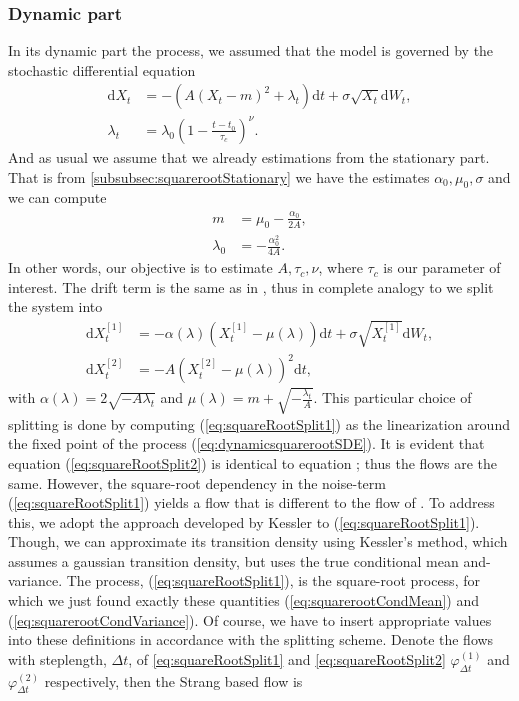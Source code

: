 \subsubsection{Dynamic part}\label{subsubsec:squarerootDynamic}
In its dynamic part the process, we assumed that the model is governed by the stochastic differential equation
\begin{align}
    \mathrm{d}X_t &= -\left(A\left(X_t - m\right)^2 + \lambda_t\right)\mathrm{d}t + \sigma \sqrt{X_t} \mathrm{d}W_t, \label{eq:dynamicsquarerootSDE}\\
    \lambda_t &= \lambda_0\left(1 - \frac{t - t_0}{\tau_c}\right)^\nu.
\end{align}
And as usual we assume that we already estimations from the stationary part. That is from \ref{subsubsec:squarerootStationary} we have the estimates $\alpha_0, \mu_0, \sigma$ and we can compute
\begin{align}
    m &= \mu_0 - \frac{\alpha_0}{2A},\\
    \lambda_0 &= - \frac{\alpha_0^2}{4A}.
\end{align}
In other words, our objective is to estimate $A, \tau_c, \nu$, where $\tau_c$ is our parameter of interest. The drift term is the same as in \cite{Ditlevsen2023}, thus in complete analogy to \cite[(S9, S10)]{DitlevsenSupplementary} we split the system into
\begin{align}
    \mathrm{d}X_t^{[1]} &= -\alpha(\lambda)\left(X_t^{[1]} - \mu(\lambda)\right)  \mathrm{d}t + \sigma \sqrt{X_t^{[1]}} \mathrm{d}W_t, \label{eq:squareRootSplit1} \\
    \mathrm{d}X_t^{[2]} &= - A \left(X_t^{[2]} - \mu(\lambda)\right)^2 \mathrm{d}t, \label{eq:squareRootSplit2}
\end{align}
with $\alpha(\lambda) = 2\sqrt{-A\lambda_t}$ and $\mu(\lambda) = m + \sqrt{-\frac{\lambda_t}{A}}$.
This particular choice of splitting is done by computing (\ref{eq:squareRootSplit1}) as the linearization around the fixed point of the process (\ref{eq:dynamicsquarerootSDE}). It is evident that equation (\ref{eq:squareRootSplit2}) is identical to equation \cite[(S10)]{DitlevsenSupplementary}; thus the flows are the same. However, the square-root dependency in the noise-term (\ref{eq:squareRootSplit1}) yields a flow that is different to the flow of \cite[(S9)]{DitlevsenSupplementary}. To address this, we adopt the approach developed by Kessler \cite{Kessler1997} to (\ref{eq:squareRootSplit1}). Though, we can approximate its transition density using Kessler's method, which assumes a gaussian transition density, but uses the true conditional mean and- variance. The process, (\ref{eq:squareRootSplit1}), is the square-root process, for which we just found exactly these quantities (\ref{eq:squarerootCondMean}) and (\ref{eq:squarerootCondVariance}). Of course, we have to insert appropriate values into these definitions in accordance with the splitting scheme. Denote the flows with steplength, $\Delta t$, of \ref{eq:squareRootSplit1} and \ref{eq:squareRootSplit2} $\varphi_{\Delta t}^{(1)}$ and $\varphi_{\Delta t}^{(2)}$ respectively, then the Strang based flow is 
